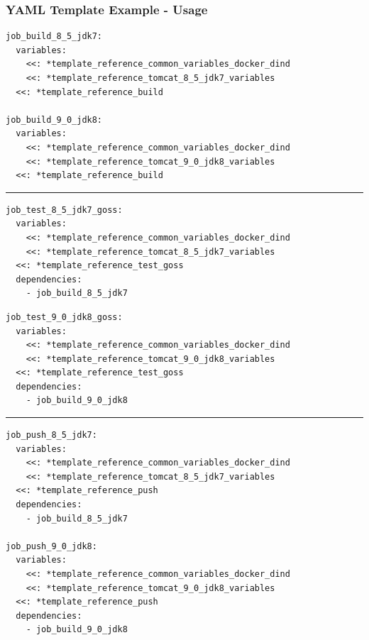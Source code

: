 \documentclass[14pt,aspectratio=169]{beamer}
\begin{document}
\begin{frame}
  \frametitle{YAML Template Example - Usage}

  \begin{multicols}{2}
    \begin{verbatim}
job_build_8_5_jdk7:
  variables:
    <<: *template_reference_common_variables_docker_dind
    <<: *template_reference_tomcat_8_5_jdk7_variables
  <<: *template_reference_build

job_build_9_0_jdk8:
  variables:
    <<: *template_reference_common_variables_docker_dind
    <<: *template_reference_tomcat_9_0_jdk8_variables
  <<: *template_reference_build
    \end{verbatim}
    \hrule
    \begin{verbatim}
job_test_8_5_jdk7_goss:
  variables:
    <<: *template_reference_common_variables_docker_dind
    <<: *template_reference_tomcat_8_5_jdk7_variables
  <<: *template_reference_test_goss
  dependencies:
    - job_build_8_5_jdk7
    \end{verbatim}
    \vfill\null
    \columnbreak
    \begin{verbatim}
job_test_9_0_jdk8_goss:
  variables:
    <<: *template_reference_common_variables_docker_dind
    <<: *template_reference_tomcat_9_0_jdk8_variables
  <<: *template_reference_test_goss
  dependencies:
    - job_build_9_0_jdk8
    \end{verbatim}
    \hrule
    \begin{verbatim}
job_push_8_5_jdk7:
  variables:
    <<: *template_reference_common_variables_docker_dind
    <<: *template_reference_tomcat_8_5_jdk7_variables
  <<: *template_reference_push
  dependencies:
    - job_build_8_5_jdk7

job_push_9_0_jdk8:
  variables:
    <<: *template_reference_common_variables_docker_dind
    <<: *template_reference_tomcat_9_0_jdk8_variables
  <<: *template_reference_push
  dependencies:
    - job_build_9_0_jdk8
    \end{verbatim}
  \end{multicols}
\end{frame}
\end{document}
